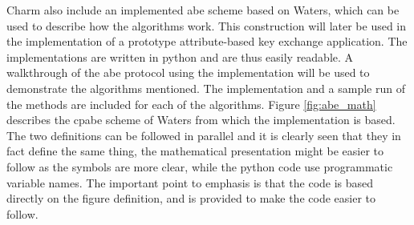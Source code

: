 Charm also include an implemented \gls{abe} scheme based on Waters\cite{abe_waters09}, which can be used to describe how the algorithms work. This construction will later be used in the implementation of a prototype attribute-based key exchange application. The implementations are written in python and are thus easily readable. A walkthrough of the \gls{abe} protocol using the implementation will be used to demonstrate the algorithms mentioned. The implementation and a sample run of the methods are included for each of the algorithms. Figure \ref{fig:abe_math} describes the \gls{cpabe} scheme of Waters\cite{abe_waters09} from which the implementation is based. The two definitions can be followed in parallel and it is clearly seen that they in fact define the same thing, the mathematical presentation might be easier to follow as the symbols are more clear, while the python code use programmatic variable names. The important point to emphasis is that the code is based directly on the figure definition, and is provided to make the code easier to follow.

